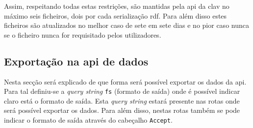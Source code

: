 Assim, respeitando todas estas restrições, são mantidas pela \acrshort{api} da \acrshort{clav} no máximo seis ficheiros, dois por cada serialização \acrshort{rdf}. Para além disso estes ficheiros são atualizados no melhor caso de sete em sete dias e no pior caso nunca se o ficheiro nunca for requisitado pelos utilizadores.

\subsection{Exportação na \acrshort{api} de dados}
Nesta secção será explicado de que forma será possível exportar os dados da \acrshort{api}. Para tal definiu-se a \textit{query string} \texttt{fs} (formato de saída) onde é possível indicar claro está o formato de saída. Esta \textit{query string} estará presente nas rotas onde será possível exportar os dados. Para além disso, nestas rotas também se pode indicar o formato de saída através do cabeçalho \texttt{Accept}.

